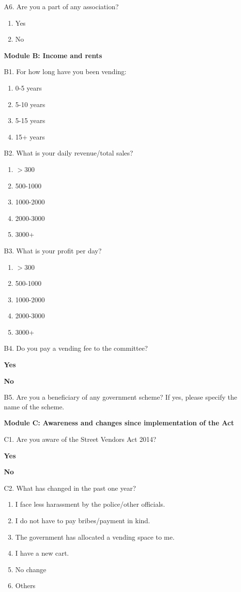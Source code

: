 \documentclass[a4paper, 12pt, twoside]{article}
\begin{document}
{{\begin{mdframed}[backgroundcolor=gray!20]
A6. Are you a part of any association?
\begin{enumerate}[nosep]
\item Yes
\item No
\end{enumerate}

\textbf{Module B: Income and rents}

B1. For how long have you been vending:
\begin{enumerate}[nosep]
\item 0-5 years
\item 5-10 years
\item 5-15 years
\item 15+ years
\end{enumerate}

B2. What is your daily revenue/total sales?
\begin{enumerate}[nosep]
\item $>$300
\item 500-1000
\item 1000-2000
\item 2000-3000
\item 3000+
\end{enumerate}

B3. What is your profit per day?
\begin{enumerate}[nosep]
\item $>$300
\item 500-1000
\item 1000-2000
\item 2000-3000
\item 3000+
\end{enumerate}

B4. Do you pay a vending fee to the committee?

\textbf{Yes}

\textbf{No}

B5. Are you a beneficiary of any government scheme? If yes, please specify the name of the scheme.

\textbf{Module C: Awareness and changes since implementation of the Act}

C1. Are you aware of the Street Vendors Act 2014?

\textbf{Yes}

\textbf{No}

C2. What has changed in the past one year?
\begin{enumerate}[nosep]
\item I face less harassment by the police/other officials.
\item I do not have to pay bribes/payment in kind.
\item The government has allocated a vending space to me.
\item I have a new cart.
\item No change
\item Others
\end{enumerate}


\end{mdframed}}}
\end{document}
